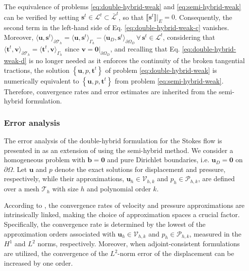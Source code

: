 \documentclass[english,11pt,3p,number,sort&compress]{elsarticle}
\newcommand{\jump}[1]
{
	\llbracket #1 \rrbracket
}
\begin{document}
The equivalence of problems \eqref{eq:double-hybrid-weak} and \eqref{eq:semi-hybrid-weak} can be verified by setting $\bm{s}^t \in \mathcal{L}^t \subset \bar{\mathcal{L}}^t$, so that $\jump{\bm{s}^t}\lvert_E=0$. Consequently, the second term in the left-hand side of Eq. \eqref{eq:double-hybrid-weak-c} vanishes. Moreover, $\langle\bm{u},\bm{s}^t\rangle_{\partial\mathcal{T}_h}=\langle\bm{u},\bm{s}^t\rangle_{\Gamma_h}-\langle\bm{u}_D,\bm{s}^t\rangle_{\partial\Omega_D} \, \forall \, \bm{s}^t \in \mathcal{L}^t$, considering that $\langle\bm{t}^t,\bm{v}\rangle_{\partial\mathcal{T}_h} = \langle\bm{t}^t,\bm{v}\rangle_{\Gamma_h}$ since $\bm{v}=\bm{0}\lvert_{\partial\Omega_D}$, and recalling that Eq. \eqref{eq:double-hybrid-weak-d} is no longer needed as it enforces the continuity of the broken tangential tractions, the solution $\left\{\bm{u},p,\bm{t}^t \right\}$ of problem \eqref{eq:double-hybrid-weak} is numerically equivalent to $\left\{\bm{u},p,\bm{t}^t \right\}$ from problem \eqref{eq:semi-hybrid-weak}. Therefore, convergence rates and error estimates are inherited from the semi-hybrid formulation.

\subsubsection{Error analysis}

The error analysis of the double-hybrid formulation for the Stokes flow is presented in \cite{puga2025stable} as an extension of \cite{carvalho2024semi} using the semi-hybrid method. We consider a homogeneous problem with $\bm{b}=\bm{0}$ and pure Dirichlet boundaries, i.e. $\bm{u}_D=\bm{0}$ on $\partial\Omega$. Let $\bm{u}$ and $p$ denote the exact solutions for displacement and pressure, respectively, while their approximations, $\bm{u}_h \in \mathcal{V}_{h,k}$ and $p_h \in \mathcal{P}_{h,k}$, are defined over a mesh $\mathcal{T}_h$ with size $h$ and polynomial order $k$.

According to \cite{brezzi2005mixed}, the convergence rates of velocity and pressure approximations are intrinsically linked, making the choice of approximation spaces a crucial factor. Specifically, the convergence rate is determined by the lowest of the approximation orders associated with $\bm{u}_h \in \mathcal{V}_{h,k}$ and $p_h \in \mathcal{P}_{h,k}$, measured in the $H^1$ and $L^2$ norms, respectively. Moreover, when adjoint-consistent formulations are utilized, the convergence of the $L^2$-norm error of the displacement can be increased by one order.
\end{document}
